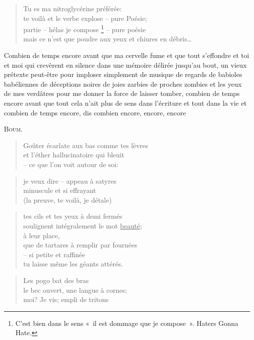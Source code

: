   \begin{verse}
    Tu es ma nitroglycérine préférée:\\
    te voilà et le verbe explose -- pure Poésie;\\
    partie -- hélas je compose
      \footnote{C’est bien dans le sens «~il est dommage que je compose~». Haters Gonna Hate.}
    -- pure poésie\\
    mais ce n’est que poudre aux yeux et chiures en débris…
  \end{verse}
  Combien de temps  encore avant que ma cervelle fume  et que tout s’effondre
  et  toi  et  moi  qui  crevèrent en  silence  dans  une  mémoire  délirée
  jusqu’au bout,  un vieux prétexte  peut-être pour imploser  simplement de
  musique de  regards de babioles  babéliennes de déceptions noires  de joies
  zarbies de proches  zombies et les yeux  de mes verdâtres pour  me donner la
  force de laisser tomber, combien de  temps encore avant que tout cela n’ait
  plus de  sens dans  l’écriture et  tout dans  la vie  et combien  de temps
  encore, dis combien encore, encore, encore
  \begin{center}
    \textsc{Boum.}
  \end{center}
  \begin{verse}
    Goûter écarlate aux bas comme tes lèvres\\
    et l’éther hallucinatoire qui bleuit\\
    -- ce que l’on voit autour de soi:
  \end{verse}
  \begin{verse}
    je veux dire -- appeau à satyres\\
    minuscule et si effrayant\\
    (la preuve, te voilà, je détale)
  \end{verse}
  \begin{verse}
    tes cils et tes yeux à demi fermés\\
    soulignent intégralement le mot \underline{beauté};\\
    à leur place,\\
    que de tartares à remplir par fournées\\
    -- si petite et raffinée\\
    tu laisse même les géants attérés.
  \end{verse}
  \begin{verse}
    Les pogo bat des bras\\
    le bec ouvert, une langue à cornes;\\
    moi? Je vis; empli de tritons
  \end{verse}
